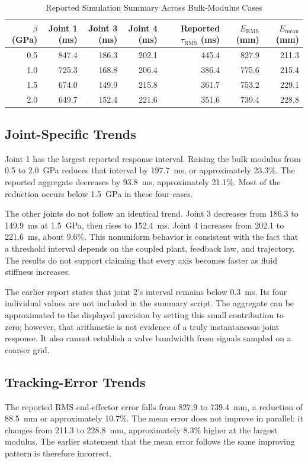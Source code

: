\documentclass[conference,letterpaper]{IEEEtran}
\begin{document}
\begin{table}[t]
\caption{Reported Simulation Summary Across Bulk-Modulus Cases}
\label{tab:results}
\centering
\begin{tabular}{rrrrrrr}
\hline
$\beta$ (GPa) & Joint 1 (ms) & Joint 3 (ms) & Joint 4 (ms) & Reported $\tau_{\mathrm{RMS}}$ (ms) & $E_{\mathrm{RMS}}$ (mm) & $E_{\mathrm{mean}}$ (mm)\\\hline
0.5 & 847.4 & 186.3 & 202.1 & 445.4 & 827.9 & 211.3\\
1.0 & 725.3 & 168.8 & 206.4 & 386.4 & 775.6 & 215.4\\
1.5 & 674.0 & 149.9 & 215.8 & 361.7 & 753.2 & 229.1\\
2.0 & 649.7 & 152.4 & 221.6 & 351.6 & 739.4 & 228.8\\\hline
\end{tabular}
\end{table}

\subsection{Joint-Specific Trends}
Joint 1 has the largest reported response interval. Raising the bulk modulus from 0.5 to 2.0~GPa reduces that interval by 197.7~ms, or approximately 23.3\%. The reported aggregate decreases by 93.8~ms, approximately 21.1\%. Most of the reduction occurs below 1.5~GPa in these four cases.

The other joints do not follow an identical trend. Joint 3 decreases from 186.3 to 149.9~ms at 1.5~GPa, then rises to 152.4~ms. Joint 4 increases from 202.1 to 221.6~ms, about 9.6\%. This nonuniform behavior is consistent with the fact that a threshold interval depends on the coupled plant, feedback law, and trajectory. The results do not support claiming that every axis becomes faster as fluid stiffness increases.

The earlier report states that joint 2's interval remains below 0.3~ms. Its four individual values are not included in the summary script. The aggregate can be approximated to the displayed precision by setting this small contribution to zero; however, that arithmetic is not evidence of a truly instantaneous joint response. It also cannot establish a valve bandwidth from signals sampled on a coarser grid.

\subsection{Tracking-Error Trends}
The reported RMS end-effector error falls from 827.9 to 739.4~mm, a reduction of 88.5~mm or approximately 10.7\%. The mean error does not improve in parallel: it changes from 211.3 to 228.8~mm, approximately 8.3\% higher at the largest modulus. The earlier statement that the mean error follows the same improving pattern is therefore incorrect.
\end{document}
